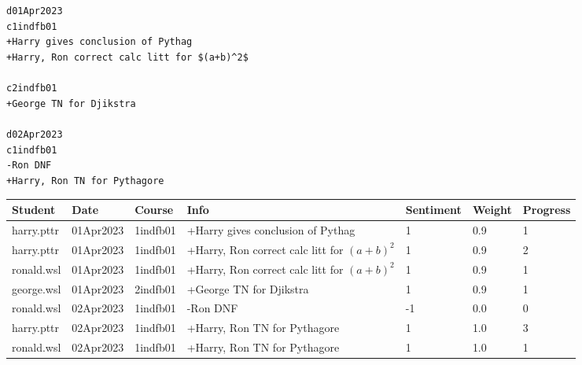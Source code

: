 \documentclass[10pt]{article}
\begin{document}
\begin{landscape}

\begin{tcolorbox}[title = comments\_file\_v1.1.txt]
\texttt{d01Apr2023\\c1indfb01\\+Harry gives conclusion of Pythag\\+Harry, Ron correct calc litt for \$(a+b)\textasciicircum2\$\\\\c2indfb01\\+George TN for Djikstra \\\\ d02Apr2023\\c1indfb01\\-Ron DNF\\+Harry, Ron TN for Pythagore}
\end{tcolorbox}


\begin{tcolorbox}[title = comments\_table\_DataFrame $\subset$ progress\_table\_DataFrame] \label{comments_table}

\begin{tabular}{|l|l|l|l|l||l|l|}
\hline
\textbf{Student} & \textbf{Date} & \textbf{Course} & \textbf{Info}                                                               & \textbf{Sentiment} & \textbf{Weight} & \textbf{Progress} \\ \hline
harry.pttr       & 01Apr2023     & 1indfb01        & +Harry gives conclusion of Pythag                                           & 1                  & 0.9             & 1                 \\ \hline
harry.pttr       & 01Apr2023     & 1indfb01        & +Harry, Ron correct calc litt for $(a+b)^2$ & 1                  & 0.9             & 2                 \\ \hline
ronald.wsl       & 01Apr2023     & 1indfb01        & +Harry, Ron correct calc litt for $(a+b)^2$ & 1                  & 0.9             & 1                 \\ \hline
george.wsl       & 01Apr2023     & 2indfb01        & +George TN for Djikstra                                                     & 1                  & 0.9             & 1                 \\ \hline
ronald.wsl       & 02Apr2023     & 1indfb01        & -Ron DNF                                                                    & -1                 & 0.0             & 0                 \\ \hline
harry.pttr       & 02Apr2023     & 1indfb01        & +Harry, Ron TN for Pythagore                                                & 1                  & 1.0             & 3                 \\ \hline
ronald.wsl       & 02Apr2023     & 1indfb01        & +Harry, Ron TN for Pythagore                                                & 1                  & 1.0             & 1                 \\ \hline
\end{tabular}
\end{tcolorbox}

\end{landscape}
\end{document}
